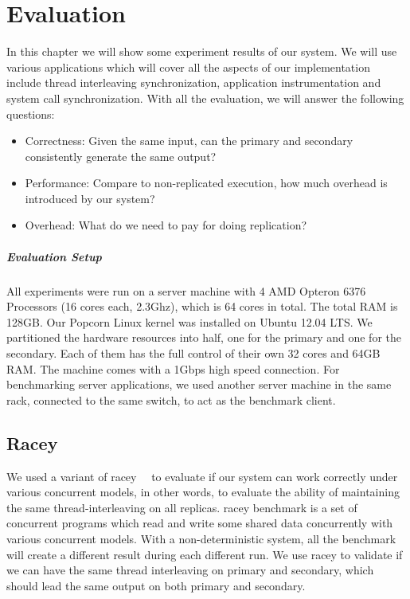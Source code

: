 \chapter{Evaluation}

In this chapter we will show some experiment results of our system. We will use various applications which will cover all the aspects of our implementation include thread interleaving synchronization, application instrumentation and system call synchronization. With all the evaluation, we will answer the following questions:

\begin{itemize}
  \item Correctness: Given the same input, can the primary and secondary consistently generate the same output?
  \item Performance: Compare to non-replicated execution, how much overhead is introduced by our system?
  \item Overhead: What do we need to pay for doing replication?
\end{itemize}

\paragraph{Evaluation Setup} All experiments were run on a server machine with 4 AMD Opteron 6376 Processors (16 cores each, 2.3Ghz), which is 64 cores in total. The total RAM is 128GB. Our Popcorn Linux kernel was installed on Ubuntu 12.04 LTS. We partitioned the hardware resources into half, one for the primary and one for the secondary. Each of them has the full control of their own 32 cores and 64GB RAM. The machine comes with a 1Gbps high speed connection. For benchmarking server applications, we used another server machine in the same rack, connected to the same switch, to act as the benchmark client.

\section{Racey}
We used a variant of racey~\cite{hillstress}~\cite{racey-suite} to evaluate if our system can work correctly under various concurrent models, in other words, to evaluate the ability of maintaining the same thread-interleaving on all replicas. racey benchmark is a set of concurrent programs which read and write some shared data concurrently with various concurrent models. With a non-deterministic system, all the benchmark will create a different result during each different run. We use racey to validate if we can have the same thread interleaving on primary and secondary, which should lead the same output on both primary and secondary.


